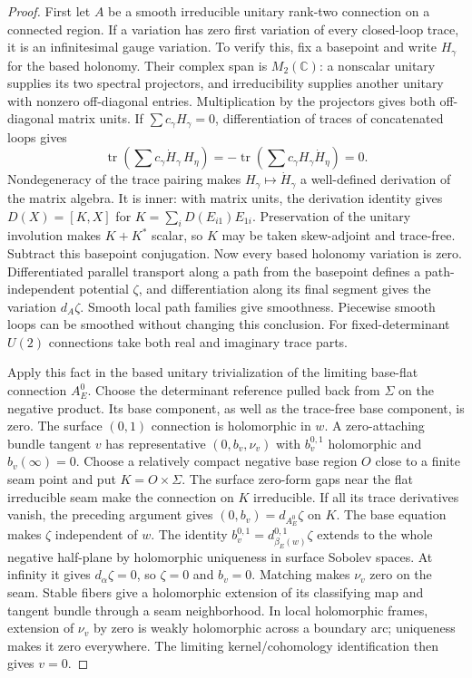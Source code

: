\documentclass[11pt]{amsart}
\theoremstyle{definition}
\theoremstyle{remark}
\theoremstyle{plain}
\begin{document}
\begin{proof}
First let $A$ be a smooth irreducible unitary rank-two connection
on a connected region. If a variation has zero first variation of
every closed-loop trace, it is an infinitesimal gauge variation.
To verify this, fix a basepoint and write $H_\gamma$ for the
based holonomy. Their complex span is $M_2(\mathbb C)$:
a nonscalar unitary supplies its two spectral projectors, and
irreducibility supplies another unitary with nonzero off-diagonal
entries. Multiplication by the projectors gives both off-diagonal
matrix units. If $\sum c_\gamma H_\gamma=0$, differentiation
of traces of concatenated loops gives
\[
 \operatorname{tr}\left(\sum c_\gamma\dot H_\gamma\,H_\eta\right)
                  =-\operatorname{tr}\left(\sum c_\gamma H_\gamma\dot H_\eta\right)=0.
\]
Nondegeneracy of the trace pairing makes
$H_\gamma\mapsto\dot H_\gamma$ a well-defined derivation of
the matrix algebra. It is inner: with matrix units, the derivation
identity gives $D(X)=[K,X]$ for
$K=\sum_iD(E_{i1})E_{1i}$. Preservation of the unitary involution
makes $K+K^*$ scalar, so $K$ may be taken skew-adjoint and
trace-free. Subtract this basepoint conjugation. Now every based
holonomy variation is zero. Differentiated parallel transport along
a path from the basepoint defines a path-independent potential
$\zeta$, and differentiation along its final segment gives the
variation $d_A\zeta$. Smooth local path families give smoothness.
Piecewise smooth loops can be smoothed without changing this conclusion.
For fixed-determinant $U(2)$ connections take both real and imaginary
trace parts.

Apply this fact in the based unitary trivialization of the limiting
base-flat connection $A_E^0$. Choose the determinant reference pulled
back from $\Sigma$ on the negative product. Its base component,
as well as the trace-free base component, is zero. The surface
$(0,1)$ connection is holomorphic in $w$. A zero-attaching
bundle tangent $v$ has representative $(0,b_v,\nu_v)$ with
$b_v^{0,1}$ holomorphic and $b_v(\infty)=0$.
Choose a relatively compact negative base region $O$ close to a
finite seam point and put $K=O\times\Sigma$. The surface
zero-form gaps near the flat irreducible seam make the connection
on $K$ irreducible. If all its trace derivatives vanish, the
preceding argument gives $(0,b_v)=d_{A_E^0}\zeta$ on $K$.
The base equation makes $\zeta$ independent of $w$.
The identity $b_v^{0,1}=d_{\beta_E(w)}^{0,1}\zeta$ extends
to the whole negative half-plane by holomorphic uniqueness in
surface Sobolev spaces. At infinity it gives $d_\alpha\zeta=0$,
so $\zeta=0$ and $b_v=0$. Matching makes $\nu_v$ zero
on the seam. Stable fibers give a holomorphic extension of its
classifying map and tangent bundle through a seam neighborhood.
In local holomorphic frames, extension of $\nu_v$ by zero is
weakly holomorphic across a boundary arc; uniqueness makes it zero
everywhere. The limiting kernel/cohomology identification then gives
$v=0$.


\end{proof}
\end{document}
